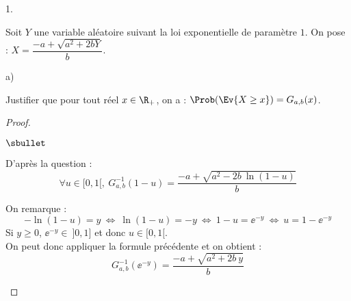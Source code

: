 \begin{noliste}{1.}
  \newpage


\item Soit $Y$ une variable aléatoire suivant la loi exponentielle de
  paramètre $1$. On pose : $X = \dfrac{-a+\sqrt{a^2+2bY}}{b}$.
  \begin{noliste}{a)}
    \setlength{\itemsep}{2mm}
  \item Justifier que pour tout réel $x\in\R_+$, on a : $\Prob(\Ev{X\geq
      x}) = G_{a,b}(x)$.

    \begin{proof}~
      \begin{noliste}{$\sbullet$}
      \item D'après la question  :
        \[
        \forall u \in [0,1[, \ G^{-1}_{a,b}(1-u) = \dfrac{-a +
          \sqrt{a^2 - 2b \ \ln(1-u)}}{b}
        \]

        On remarque :
        \[
         -\ln(1-u) = y \ \Leftrightarrow \ \ln(1-u) = -y \ 
	 \Leftrightarrow \ 1 - u = \ee^{-y} \ \Leftrightarrow \
	 u = 1 - \ee^{-y}
        \]
        Si $y \geq 0$, $\ee^{-y} \in \ ]0, 1]$ et donc $u \in [0, 1[$.\\
        On peut donc appliquer la formule précédente et
        on obtient :
        \[
        G^{-1}_{a,b}(\ee^{-y}) = \dfrac{-a + \sqrt{a^2 + 2b \ y}}{b}
        \]


\end{noliste}
\end{proof}
\end{noliste}
\end{noliste}
